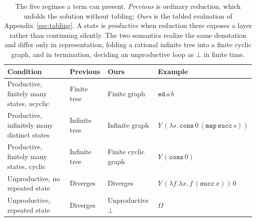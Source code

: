 \begin{table}
  \caption{The five regimes a term can present. \emph{Previous} is ordinary reduction, which unfolds the
    solution without tabling; \emph{Ours} is the tabled evaluation of Appendix~\ref{sec:tabling}. A state is
    \emph{productive} when reduction there exposes a layer rather than continuing silently. The two
    semantics realize the same denotation and differ only in representation, folding a rational infinite
    tree into a finite cyclic graph, and in termination, deciding an unproductive loop as $\bot$ in finite
  time.}
  \label{tab:cases}
  \centering\footnotesize
  \setlength{\tabcolsep}{5pt}
  \begin{tabular}{@{}p{}p{}p{}p{}@{}}
    \hline
    Condition & Previous & Ours & Example \\
    \hline
    Productive, finitely many states, acyclic & Finite tree & Finite graph & $\mathtt{ed}\,a\,b$ \\
    Productive, infinitely many distinct states & Infinite tree & Infinite graph & $Y\,(\lambda s.\,\mathtt{cons}\,0\,(\mathtt{map}\,\mathtt{succ}\,s))$ \\
    Productive, finitely many states, cyclic & Infinite tree & Finite cyclic graph & $Y\,(\mathtt{cons}\,0)$ \\
    Unproductive, no repeated state & Diverges & Diverges & $Y\,(\lambda f.\lambda x.\,f\,(\mathtt{succ}\,x))\,0$ \\
    Unproductive, repeated state & Diverges & Unproductive $\bot$ & $\Omega$ \\
    \hline
  \end{tabular}
\end{table}

